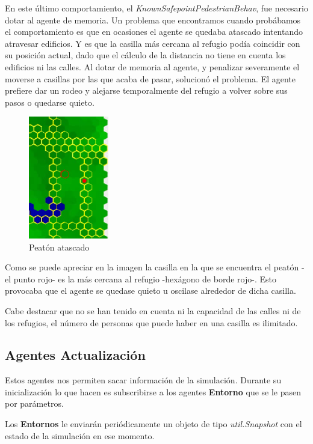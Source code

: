 En este último comportamiento, el {\em KnownSafepointPedestrianBehav}, fue
necesario dotar al agente de memoria. Un problema que encontramos cuando
probábamos el comportamiento es que en ocasiones el agente se quedaba atascado
intentando atravesar edificios. Y es que la casilla más cercana al refugio
podía coincidir con su posición actual, dado que el cálculo de la distancia no
tiene en cuenta los edificios ni las calles. Al dotar de memoria al agente, y
penalizar severamente el moverse a casillas por las que acaba de pasar,
solucionó el problema. El agente prefiere dar un rodeo y alejarse temporalmente
del refugio a volver sobre sus pasos o quedarse quieto.

\begin{figure}[H]
 \centering
 \includegraphics[width=35mm]{figuras/cap5/atasco.png}
 \caption{Peatón atascado}
\end{figure}

Como se puede apreciar en la imagen la casilla en la que se encuentra el peatón
-el punto rojo- es la más cercana al refugio -hexágono de borde rojo-. Esto
provocaba que el agente se quedase quieto u oscilase alrededor de dicha casilla.

Cabe destacar que no se han tenido en cuenta ni la capacidad de las calles ni
de los refugios, el número de personas que puede haber en una casilla es
ilimitado.


\subsection*{Agentes Actualización}

Estos agentes nos permiten sacar información de la simulación. Durante su
inicialización lo que hacen es subscribirse a los agentes {\bf Entorno} que se
le pasen por parámetros.

Los {\bf Entornos} le enviarán periódicamente un objeto de tipo {\em
util.Snapshot} con el estado de la simulación en ese momento.

